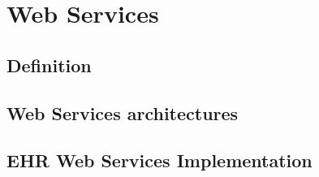 \chapter{Web Services}
\section{Definition}
\section{Web Services architectures}
\section{EHR Web Services Implementation}

